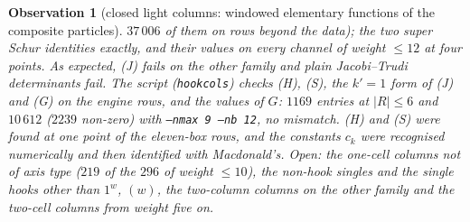 \documentclass[11pt]{article}
\newtheorem{observation}{Observation}
\newcommand{\LMPH}[1]{\texttt{#1}}
\begin{document}
\begin{observation}[closed light columns: windowed elementary functions of the composite particles]
$37\,006$ of them on rows beyond the data); the two super Schur identities exactly, and their values on every channel of
weight $\le12$ at four points.  As expected, (J) fails on the other family and plain Jacobi--Trudi determinants fail.
The script (\LMPH{hookcols}) checks (H), (S), the $k'=1$ form of (J) and (G) on the engine rows, and the values of $G$:
$1169$ entries at $|R|\le6$ and $10\,612$ ($2239$ non-zero) with \LMPH{--nmax 9 --nb 12}, no mismatch.
(H) and (S) were found at one point of the eleven-box rows, and the constants $c_k$ were recognised numerically and then
identified with Macdonald's.  Open: the one-cell columns not of axis type ($219$ of the $296$ of weight $\le10$), the
non-hook singles and the single hooks other than $1^w$, $(w)$, the two-column columns on the other family and the
two-cell columns from weight five on.
\end{observation}
\end{document}
